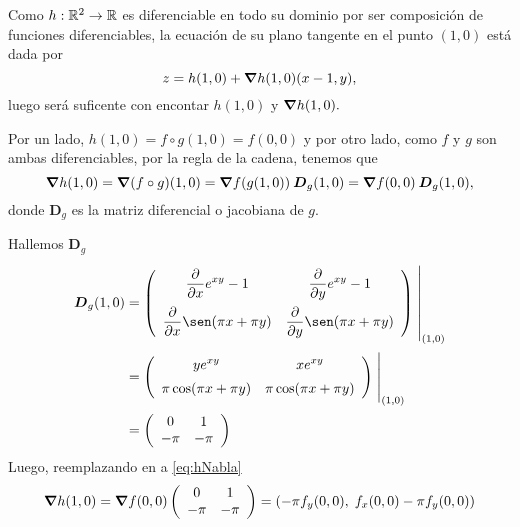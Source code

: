 \begin{solution}

    Como   $h:\mathbb{R}^2\to\mathbb{R}$ es diferenciable en todo su dominio por ser composición de funciones diferenciables,  la ecuaci\'on de su plano tangente en el punto $(1,0)$ est\'a dada por
    \begin{equation}
        z= h(1,0) + \grad h(1,0) (x-1,y),  \label{eq:zNabla}
    \end{equation}   luego ser\'a  suficente con encontar $ h(1,0)$ y $\grad h(1,0).$

    Por un lado,      $h(1,0)= f\circ g (1,0) =  f(0,0)$  y por otro lado,  como $f$ y $g$ son ambas diferenciables,  por la regla de la cadena,  tenemos que
    \begin{equation}
        \grad h(1,0)=\grad (f\circ g)(1,0)=\grad f(g(1,0)) \:\boldsymbol{D}_g(1,0) = \grad f (0,0) \:\boldsymbol{D}_g(1,0),  \label{eq:hNabla}
    \end{equation}    donde $\boldsymbol{D}_g$ es la matriz diferencial o  jacobiana de $g$.

    \noindent  Hallemos $\boldsymbol{D}_g$
    \begin{align*}
        \boldsymbol{D}_g(1,0) & =
        \left(\begin{array}{cc}
                      \displaystyle\partialx e^{xy}-1            & \displaystyle\partialy e^{xy}-1           \\[10pt]
                      \displaystyle\partialx  \sen (\pi x+\pi y) & \displaystyle\partialy \sen (\pi x+\pi y)
                  \end{array}\right)\left.\rule{0pt}{1.1cm}\right\rvert_{(1,0)}             \\[2pt]
                              & =\left(\begin{array}{cc}
                                               \displaystyle ye^{xy}                 & \displaystyle xe^{xy}              \\[5pt]
                                               \displaystyle   \pi\cos (\pi x+\pi y) & \displaystyle \pi\cos(\pi x+\pi y)
                                           \end{array}\right)\left.\rule{0pt}{0.7cm}\right\rvert_{(1,0)} \\[2pt]
                              & =\left(\begin{array}{cc}
                                               0    & 1    \\
                                               -\pi & -\pi
                                           \end{array}\right)
    \end{align*}
    Luego, reemplazando en  a   \eqref{eq:hNabla}
    \[
        \grad h(1,0) = \grad f(0,0)\left(\begin{array}{cc}
                0    & 1    \\
                -\pi & -\pi
            \end{array}\right) = \left(-\pi f_y(0,0),\;f_x(0,0)-\pi f_y(0,0)\right)
    \]


\end{solution}
